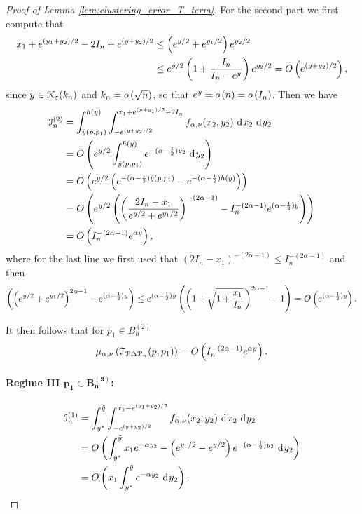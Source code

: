\begin{proof}[Proof of Lemma \ref{lem:clustering_error_T_term}]
For the second part we first compute that 
\begin{align*}
	x_1 + e^{(y_1+y_2)/2} - 2 I_n + e^{(y + y_2)/2} &\le \left(e^{y/2} + e^{y_1/2}\right)e^{y_2/2}\\
	&\le e^{y/2}\left(1 + \frac{I_n}{I_n - e^y}\right)e^{y_2/2} = O\left(e^{(y+y_2)/2}\right),
\end{align*}
since $y \in {\mathcal K}_{\varepsilon}(k_n)$ and $k_n = o\left(\sqrt{n}\right)$, so that $e^y = o\left(n\right) = o\left(I_n\right)$. 
Then we have
\begin{align*}
	\mathcal{I}_n^{(2)} &= \int_{\hat{y}(p,p_1)}^{h(y)} \int_{-e^{(y + y_2)/2}}^{x_1 + e^{(y+y_1)/2} - 2 I_n} 
		f_{\alpha,\nu}(x_2, y_2) \operatorname{\, \mathrm{d}\hspace{-1pt}} x_2 \operatorname{\, \mathrm{d}\hspace{-1pt}} y_2\\
	&= O\left(e^{y/2} \int_{\hat{y}(p,p_1)}^{h(y)} e^{-(\alpha -\frac{1}{2}) y_2} \operatorname{\, \mathrm{d}\hspace{-1pt}} y_2\right)\\
	&= O\left(e^{y/2} \left(e^{-(\alpha -\frac{1}{2}) \hat{y}(p,p_1)} - e^{-(\alpha -\frac{1}{2}) h(y)}\right)\right)\\
	&= O\left(e^{y/2} \left(\left(\frac{2I_n - x_1}{e^{y/2} + e^{y_1/2}}\right)^{-(2\alpha-1)} 
		- I_n^{-(2\alpha-1)} e^{(\alpha -\frac{1}{2}) y}\right)\right)\\
	&= O\left(I_n^{-(2\alpha-1)} e^{\alpha y}\right),
\end{align*}
where for the last line we first used that $(2I_n - x_1)^{-(2\alpha-1)} \le I_n^{-(2\alpha-1)}$ and then
\[
	\left(\left(e^{y/2} + e^{y_1/2}\right)^{2\alpha-1}- e^{(\alpha -\frac{1}{2}) y}\right)
	\le e^{(\alpha -\frac{1}{2}) y}\left(\left(1 + \sqrt{1+\frac{x_1}{I_n}} \, \right)^{2\alpha - 1} - 1\right)
	= O\left(e^{(\alpha -\frac{1}{2}) y}\right).
\]

It then follows that for $p_1 \in B_n^{(2)}$
\[
	\mu_{\alpha, \nu}\left(\mathcal{T}_{{\mathcal P} \Delta {\mathcal P}_n}(p,p_1)\right) = O\left(I_n^{-(2\alpha-1)} e^{\alpha y}\right).
\]

\paragraph{Regime III $\bm{p_1 \in B_n^{(3)}}$:}

\begin{align*}
	\mathcal{I}_n^{(1)} &= \int_{y^\ast}^{\tilde{y}} \int_{-e^{(y+y_2)/2}}^{x_1-e^{(y_1+y_2)/2}} f_{\alpha, \nu}(x_2,y_2)
		\operatorname{\, \mathrm{d}\hspace{-1pt}} x_2 \operatorname{\, \mathrm{d}\hspace{-1pt}} y_2\\
	&= O\left(\int_{y^\ast}^{\tilde{y}} x_1 e^{-\alpha y_2} - \left(e^{y_1/2} - e^{y/2}\right)e^{-(\alpha - \frac{1}{2})y_2}
		\operatorname{\, \mathrm{d}\hspace{-1pt}} y_2\right)\\
	&= O\left(x_1 \int_{y^\ast}^{\tilde{y}}  e^{-\alpha y_2} \operatorname{\, \mathrm{d}\hspace{-1pt}} y_2\right).
\end{align*}


\end{proof}
